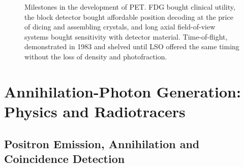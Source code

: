 \begin{figure}[tbp]
	\centering
	
	\caption[Broad milestones in the development of PET]{%
		Milestones in the development of PET.
		FDG bought clinical utility, the block detector bought affordable position decoding at the price of dicing and assembling crystals, and long axial field-of-view systems bought sensitivity with detector material.
		Time-of-flight, demonstrated in 1983 and shelved until LSO offered the same timing without the loss of density and photofraction.}
	\label{fig:pet-timeline}
\end{figure}

\section{Annihilation-Photon Generation: Physics and Radiotracers}
\label{sec:photon-generation}

\subsection{Positron Emission, Annihilation and Coincidence Detection}
\label{sec:annihilation}


